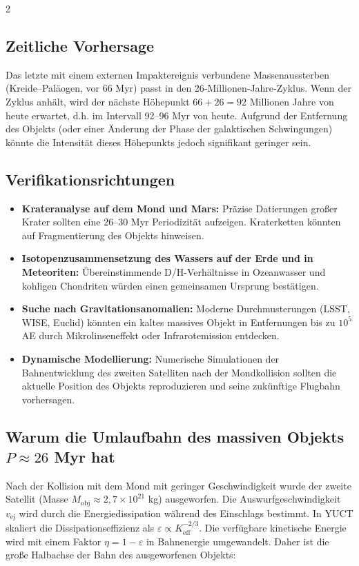 \documentclass[11pt,a4paper]{article}
\begin{document}
\begin{multicols}{2}
		\subsection{Zeitliche Vorhersage}
		
		Das letzte mit einem externen Impaktereignis verbundene Massenaussterben (Kreide–Paläogen, vor 66 Myr) passt in den 26‑Millionen‑Jahre‑Zyklus. Wenn der Zyklus anhält, wird der nächste Höhepunkt \(66 + 26 = 92\) Millionen Jahre von heute erwartet, d.h. im Intervall 92–96 Myr von heute. Aufgrund der Entfernung des Objekts (oder einer Änderung der Phase der galaktischen Schwingungen) könnte die Intensität dieses Höhepunkts jedoch signifikant geringer sein.
		
		\subsection{Verifikationsrichtungen}
		
		\begin{itemize}
			\item \textbf{Krateranalyse auf dem Mond und Mars:} Präzise Datierungen großer Krater sollten eine 26–30 Myr Periodizität aufzeigen. Kraterketten könnten auf Fragmentierung des Objekts hinweisen.
			\item \textbf{Isotopenzusammensetzung des Wassers auf der Erde und in Meteoriten:} Übereinstimmende D/H-Verhältnisse in Ozeanwasser und kohligen Chondriten würden einen gemeinsamen Ursprung bestätigen.
			\item \textbf{Suche nach Gravitationsanomalien:} Moderne Durchmusterungen (LSST, WISE, Euclid) könnten ein kaltes massives Objekt in Entfernungen bis zu \(10^5\) AE durch Mikrolinseneffekt oder Infrarotemission entdecken.
			\item \textbf{Dynamische Modellierung:} Numerische Simulationen der Bahnentwicklung des zweiten Satelliten nach der Mondkollision sollten die aktuelle Position des Objekts reproduzieren und seine zukünftige Flugbahn vorhersagen.
		\end{itemize}
		
		\subsection{Warum die Umlaufbahn des massiven Objekts \(P \approx 26\) Myr hat}
		
		Nach der Kollision mit dem Mond mit geringer Geschwindigkeit wurde der zweite Satellit (Masse $M_{\text{obj}} \approx 2,7\times10^{21}$ kg) ausgeworfen. Die Auswurfgeschwindigkeit $v_{\text{ej}}$ wird durch die Energiedissipation während des Einschlags bestimmt. In YUCT skaliert die Dissipationseffizienz als $\varepsilon \propto K_{\mathrm{eff}}^{-2/3}$. Die verfügbare kinetische Energie wird mit einem Faktor $\eta = 1 - \varepsilon$ in Bahnenergie umgewandelt. Daher ist die große Halbachse der Bahn des ausgeworfenen Objekts:
		

\end{multicols}
\end{document}
